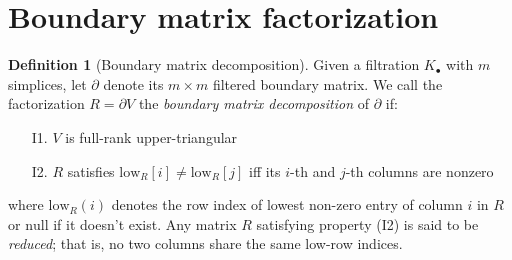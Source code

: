 \documentclass[10pt]{article}
\numberwithin{equation}{section}
\newcommand{\+}{%
	\raisebox{0.18ex}{\scaleobj{0.55}{+}}
}
\theoremstyle{definition}
\newtheorem{definition}{Definition}
\theoremstyle{definition}
\begin{document}






\appendix

\section{Boundary matrix factorization}
\begin{definition}[Boundary matrix decomposition]
Given a filtration $K_\bullet$ with $m$ simplices, let $\partial$ denote its $m \times m$ filtered boundary matrix. We call the factorization $R = \partial V$ the \emph{boundary matrix decomposition} of $\partial$ if:
 \begin{enumerate}[labelsep=3pt, topsep=3pt, itemsep=-0.10ex,parsep=1.2ex]
 	\item[I1.] $V$ is full-rank upper-triangular
 	\item[I2.] $R$ satisfies $\mathrm{low}_R[i] \neq \mathrm{low}_R[j]$ iff its $i$-th and $j$-th columns are nonzero
 	\end{enumerate} 
 	where $\mathrm{low}_R(i)$ denotes the row index of lowest non-zero entry of column $i$ in $R$ or $\mathrm{null}$ if it doesn't exist. Any matrix $R$ satisfying property (I2) is said to be  \emph{reduced}; that is, no two columns share the same low-row indices.
\end{definition}
\end{document}
